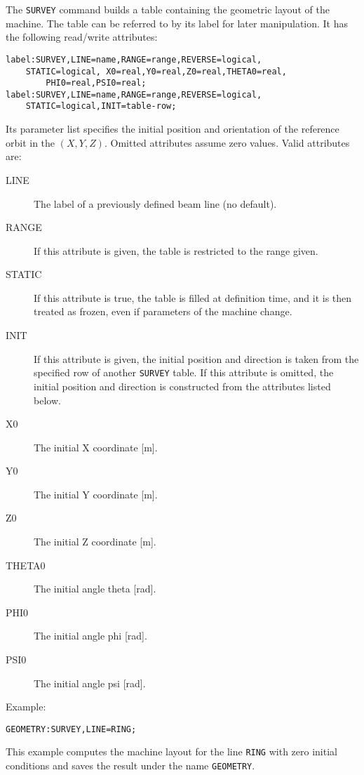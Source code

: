 The \texttt{SURVEY} command builds a table containing the geometric layout
of the machine.
The table can be referred to by its label for later manipulation.
It has the following read/write attributes:
\begin{verbatim}
label:SURVEY,LINE=name,RANGE=range,REVERSE=logical,
	STATIC=logical, X0=real,Y0=real,Z0=real,THETA0=real,
    	PHI0=real,PSI0=real;
label:SURVEY,LINE=name,RANGE=range,REVERSE=logical,
	STATIC=logical,INIT=table-row;
\end{verbatim}
Its parameter list specifies the initial position and orientation
of the reference orbit in the  
$(X,Y,Z)$.
Omitted attributes assume zero values.
Valid attributes are:
\begin{description}
\item[LINE]
  The label of a previously defined beam line (no default).
\item[RANGE]
  If this attribute is given, the table is restricted to the range given.
\item[STATIC]
  If this attribute is true, the table is filled at definition time,
  and it is then treated as frozen, even if parameters of the machine change.
\item[INIT]
  If this attribute is given, the initial position and direction is taken
  from the specified row of another \texttt{SURVEY} table.
  If this attribute is omitted, the initial position and direction is
  constructed from the attributes listed below.
\item[X0]
  The initial X coordinate [m].
\item[Y0]
  The initial Y coordinate [m].
\item[Z0]
  The initial Z coordinate [m].
\item[THETA0]
  The initial angle theta [rad].
\item[PHI0]
  The initial angle phi [rad].
\item[PSI0]
  The initial angle psi [rad].
\end{description}

Example:
\begin{verbatim}
GEOMETRY:SURVEY,LINE=RING;
\end{verbatim}
This example computes the machine layout for the line \texttt{RING} with
zero initial conditions and saves the result under the name
\texttt{GEOMETRY}. 

